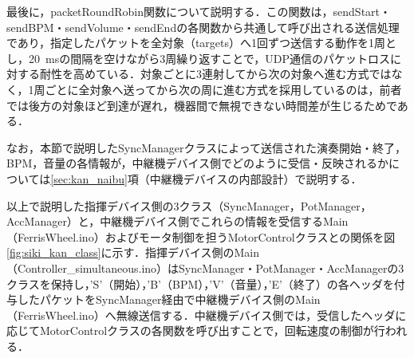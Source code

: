 
最後に，packetRoundRobin関数について説明する．この関数は，sendStart・sendBPM・sendVolume・sendEndの各関数から共通して呼び出される送信処理であり，指定したパケットを全対象（targets）へ1回ずつ送信する動作を1周とし，\SI{20}{ms}の間隔を空けながら3周繰り返すことで，UDP通信のパケットロスに対する耐性を高めている．対象ごとに3連射してから次の対象へ進む方式ではなく，1周ごとに全対象へ送ってから次の周に進む方式を採用しているのは，前者では後方の対象ほど到達が遅れ，機器間で無視できない時間差が生じるためである．

\FloatBarrier



なお，本節で説明したSyncManagerクラスによって送信された演奏開始・終了，BPM，音量の各情報が，中継機デバイス側でどのように受信・反映されるかについては\ref{sec:kan_naibu}項（中継機デバイスの内部設計）で説明する．

以上で説明した指揮デバイス側の3クラス（SyncManager，PotManager，AccManager）と，中継機デバイス側でこれらの情報を受信するMain（FerrisWheel.ino）およびモータ制御を担うMotorControlクラスとの関係を図\ref{fig:siki_kan_class}に示す．指揮デバイス側のMain（Controller\_simultaneous.ino）はSyncManager・PotManager・AccManagerの3クラスを保持し，'S'（開始），'B'（BPM），'V'（音量），'E'（終了）の各ヘッダを付与したパケットをSyncManager経由で中継機デバイス側のMain（FerrisWheel.ino）へ無線送信する．中継機デバイス側では，受信したヘッダに応じてMotorControlクラスの各関数を呼び出すことで，回転速度の制御が行われる．

